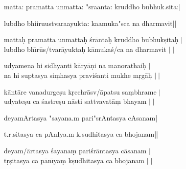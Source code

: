 





\noindent
{\dn \dnlarge matta: pramatta unmatta: "sraanta: kruddho bubhuk.sita:|

\noindent lubdho bhiiruustvaraayukta: kaamuka"sca na dharmavit||
}

\bigskip

\noindent 
matta\d{h} pramatta unmatta\d{h} \'{s}r\={a}nta\d{h} kruddho bubhuk\d{s}ita\d{h} $\mid$ \\
lubdho bh\={\i}r\={u}s/tvar\={a}yukta\d{h} k\={a}muka\'{s}/ca na dharmavit $\mid\mid$

\bigskip \bigskip \bigskip


\bigskip

\noindent
udyamena hi sidhyanti k\={a}ry\={a}\d{n}i na manorathai\d{h} $\mid$ \\
na hi suptasya si\d{m}hasya pravi\'{s}anti mukhe m\d{r}g\={a}\d{h} $\mid\mid$

\bigskip \bigskip \bigskip


\bigskip

\noindent
k\={a}nt\={a}re vanadurge\d{s}u k\d{r}cchr\={a}sv/\={a}patsu sa\d{m}bhrame $\mid$ \\
udyate\d{s}u ca \'{s}astre\d{s}u n\={a}sti sattvavat\={a}\d{m} bhayam $\mid\mid$

\bigskip \bigskip \bigskip

\noindent
{\dn \dnlarge deyamArtasya "sayana.m pari"srAntasya cAsanam|

\noindent t.r.sitasya ca pAnIya.m k.sudhitasya ca bhojanam||
}

\bigskip

\noindent
deyam/\={a}rtasya \'{s}ayana\d{m} pari\'{s}r\={a}ntasya c\={a}sanam $\mid$ \\
t\d{r}\d{s}itasya ca p\={a}n\={\i}ya\d{m} k\d{s}udhitasya ca bhojanam $\mid\mid$



